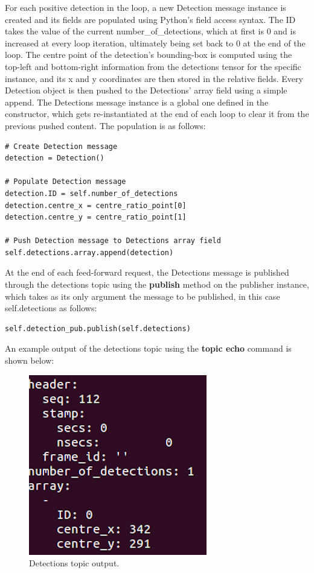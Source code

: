 For each positive detection in the loop, a new Detection message instance is created and its fields are populated using Python's field access syntax. The ID takes the value of the current number\_of\_detections, which at first is 0 and is increased at every loop iteration, ultimately being set back to 0 at the end of the loop. The centre point of the detection's bounding-box is computed using the top-left and bottom-right information from the detections tensor for the specific instance, and its x and y coordinates are then stored in the relative fields. Every Detection object is then pushed to the Detections' array field using a simple append. The Detections message instance is a global one defined in the constructor, which gets re-instantiated at the end of each loop to clear it from the previous pushed content. The population is as follows:

\begin{lstlisting}
# Create Detection message
detection = Detection()

# Populate Detection message
detection.ID = self.number_of_detections
detection.centre_x = centre_ratio_point[0]
detection.centre_y = centre_ratio_point[1]

# Push Detection message to Detections array field
self.detections.array.append(detection)
\end{lstlisting}

At the end of each feed-forward request, the Detections message is published through the detections topic using the \textbf{publish} method on the publisher instance, which takes as its only argument the message to be published, in this case self.detections as follows:

\begin{lstlisting}
self.detection_pub.publish(self.detections)
\end{lstlisting}

An example output of the detections topic using the \textbf{topic echo} command is shown below:

\begin{figure}[H]
  \begin{center}
    \includegraphics[width=0.5\linewidth]{images/chapter3.png}
  \end{center}
  \caption{Detections topic output.}
  \label{fig:det_topic}
\end{figure}

